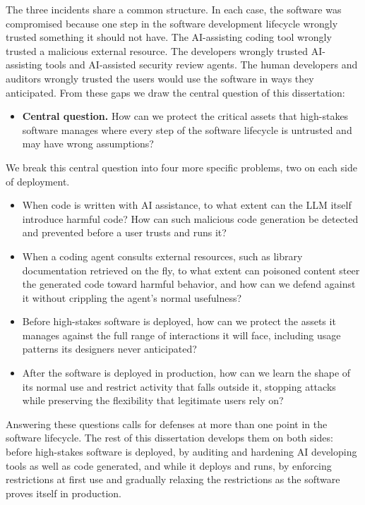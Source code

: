 The three incidents share a common structure. In each case, the software was
compromised because one step in the software development 
lifecycle wrongly trusted something it should not have.
The AI-assisting coding tool wrongly trusted 
a malicious external resource. 
The developers wrongly trusted AI-assisting tools and 
AI-assisted security review agents. 
The human developers and auditors wrongly trusted the users
would use the software in ways they anticipated.
From these gaps we draw the central question
of this dissertation:

\begin{itemize}
  \item \textbf{Central question.} How can we protect the 
  critical assets that
  high-stakes software manages where every step 
  of the software lifecycle is untrusted and may have 
  wrong assumptions?
\end{itemize}

We break this central question into four more specific problems, two on each
side of deployment.

\begin{itemize}
  \item When code is
  written with AI assistance, to what extent can the LLM itself introduce
  harmful code?
  How can such malicious code generation be detected and prevented before a user trusts and runs it?

  \item When a coding
  agent consults external resources, such as library documentation retrieved on
  the fly, to what extent can poisoned content steer the generated code toward
  harmful behavior, and how can we defend against it without crippling the agent's
  normal usefulness?

  \item  Before high-stakes
  software is deployed, how can we protect the assets it manages against the full
  range of interactions it will face, including usage patterns its designers never
  anticipated?
  
  \item After the software is deployed in production,
  how can we learn the shape of its normal use and restrict activity that falls
  outside it, stopping attacks while preserving the flexibility that legitimate
  users rely on?

\end{itemize}

Answering these questions calls for defenses at more than one point in the
software lifecycle. The rest of this dissertation develops them on both sides:
before high-stakes software is deployed, by auditing and hardening
AI developing tools as well as code generated,
and while it deploys and runs,
by enforcing restrictions at first use and gradually
relaxing the restrictions as the software proves itself in production.

